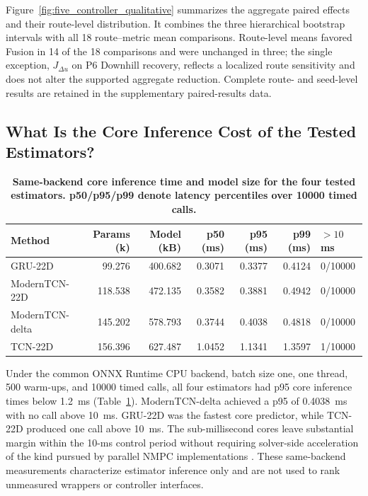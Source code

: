 \documentclass{ieeeaccess}
\newcommand{\citep}[1]{\cite{#1}}
\begin{document}
Figure~\ref{fig:five_controller_qualitative} summarizes the aggregate paired effects and their route-level distribution. It combines the three hierarchical bootstrap intervals with all 18 route--metric mean comparisons. Route-level means favored Fusion in 14 of the 18 comparisons and were unchanged in three; the single exception, $J_{\Delta u}$ on P6 Downhill recovery, reflects a localized route sensitivity and does not alter the supported aggregate reduction. Complete route- and seed-level results are retained in the supplementary paired-results data.

\subsection{What Is the Core Inference Cost of the Tested Estimators?}

\begin{table}[!t]
\centering
\caption{\textbf{Same-backend core inference time and model size for the four tested estimators. p50/p95/p99 denote latency percentiles over 10000 timed calls.}}
\label{tab:runtime_scope}
\scriptsize
\setlength{\tabcolsep}{2.8pt}
\setlength{\tabcolsep}{3pt}
\begin{tabular}{|l|r|r|r|r|r|l|}
\hline
Method & Params (k) & Model (kB) & p50 (ms) & p95 (ms) & p99 (ms) & $>10$ ms \\
\hline
GRU-22D & 99.276 & 400.682 & 0.3071 & 0.3377 & 0.4124 & 0/10000 \\
ModernTCN-22D & 118.538 & 472.135 & 0.3582 & 0.3881 & 0.4942 & 0/10000 \\
ModernTCN-delta & 145.202 & 578.793 & 0.3744 & 0.4038 & 0.4818 & 0/10000 \\
TCN-22D & 156.396 & 627.487 & 1.0452 & 1.1341 & 1.3597 & 1/10000 \\
\hline
\end{tabular}
\end{table}


Under the common ONNX Runtime CPU backend, batch size one, one thread, 500 warm-ups, and 10000 timed calls, all four estimators had p95 core inference times below 1.2~ms (Table~\ref{tab:runtime_scope}). ModernTCN-delta achieved a p95 of 0.4038~ms with no call above 10~ms. GRU-22D was the fastest core predictor, while TCN-22D produced one call above 10~ms. The sub-millisecond cores leave substantial margin within the 10-ms control period without requiring solver-side acceleration of the kind pursued by parallel NMPC implementations \citep{Xu2024ParallelNMPC}. These same-backend measurements characterize estimator inference only and are not used to rank unmeasured wrappers or controller interfaces.
\end{document}
